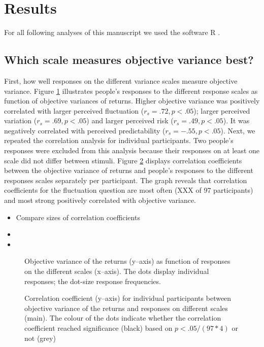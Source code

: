 \documentclass[a4paper,doc, natbib]{apa6} %
\begin{document}
\section{Results}
For all following analyses of this manuscript we used the software R \citep{R2014}. 
\subsection{Which scale measures objective variance best?}
First, how well responses on the different variance scales measure objective variance. Figure \ref{fig:rsvo} illustrates people's responses to the different response scales as function of objective variances of returns. Higher objective variance was positively correlated with larger perceived fluctuation ($r_{s} = .72, p < .05$); larger perceived variation ($r_{s} = .69, p < .05$) and larger perceived risk ($r_{s} = .49, p < .05$). It was negatively correlated with perceived predictability ($r_{s} = -.55, p < .05$). Next, we repeated the correlation analysis for individual participants. Two people's responses were excluded from this analysis because their responses on at least one scale did not differ between stimuli. Figure \ref{fig:rsvoind} displays correlation coefficients between the objective variance of returns and people's responses to the different responses scales separately per participant. The graph reveals that correlation coefficients for the fluctuation question are most often (XXX of 97 participants) and most strong positively correlated with objective variance. 

\begin{itemize}
\item Compare sizes of correlation coefficients
\item 
\item 
\end{itemize}


\begin{figure}[!htbp] 
  \centering
  \caption{Objective variance of the returns (y--axis) as function of responses on the different scales (x--axis). The dots display individual responses; the dot-size response frequencies.}
  \label{fig:rsvo}
\end{figure}


\begin{figure}[!htbp] 
  \centering
  \caption{Correlation coefficient (y--axis) for individual participants between objective variance of the returns and responses on different scales (main). The colour of the dots indicate whether the correlation coefficient reached significance (black) based on $p < .05 / (97 * 4)$ or not (grey)}
  \label{fig:rsvoind}
\end{figure}
\end{document}
